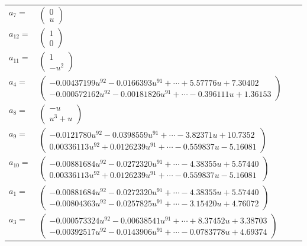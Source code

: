 \documentclass[1p]{elsarticle_modified}
\theoremstyle{definition}
\begin{document}
\begin{tabular}{m{7pt} m{180pt} m{7pt} m{180pt} }
\flushright $a_{7}=$&$\begin{pmatrix}0\\u\end{pmatrix}$ \\
\flushright $a_{12}=$&$\begin{pmatrix}1\\0\end{pmatrix}$ \\
\flushright $a_{11}=$&$\begin{pmatrix}1\\- u^2\end{pmatrix}$ \\
\flushright $a_{4}=$&$\begin{pmatrix}-0.00437199 u^{92}-0.0166393 u^{91}+\cdots+5.57776 u+7.30402\\-0.000572162 u^{92}-0.00181826 u^{91}+\cdots-0.396111 u+1.36153\end{pmatrix}$ \\
\flushright $a_{8}=$&$\begin{pmatrix}- u\\u^3+u\end{pmatrix}$ \\
\flushright $a_{9}=$&$\begin{pmatrix}-0.0121780 u^{92}-0.0398559 u^{91}+\cdots-3.82371 u+10.7352\\0.00336113 u^{92}+0.0126239 u^{91}+\cdots-0.559837 u-5.16081\end{pmatrix}$ \\
\flushright $a_{10}=$&$\begin{pmatrix}-0.00881684 u^{92}-0.0272320 u^{91}+\cdots-4.38355 u+5.57440\\0.00336113 u^{92}+0.0126239 u^{91}+\cdots-0.559837 u-5.16081\end{pmatrix}$ \\
\flushright $a_{1}=$&$\begin{pmatrix}-0.00881684 u^{92}-0.0272320 u^{91}+\cdots-4.38355 u+5.57440\\-0.00804363 u^{92}-0.0257825 u^{91}+\cdots-3.15420 u+4.76072\end{pmatrix}$ \\
\flushright $a_{3}=$&$\begin{pmatrix}-0.000573324 u^{92}-0.00638541 u^{91}+\cdots+8.37452 u+3.38703\\-0.00392517 u^{92}-0.0143906 u^{91}+\cdots-0.0783778 u+4.69374\end{pmatrix}$ \\

\end{tabular}
\end{document}
